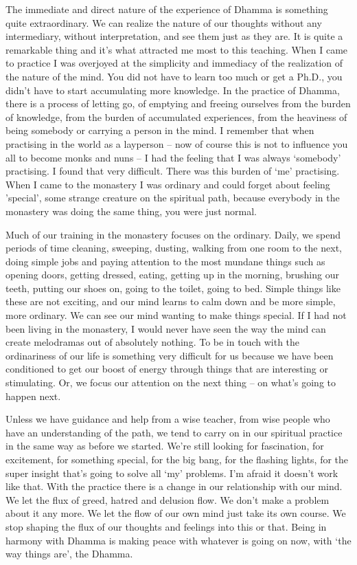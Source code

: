 The immediate and direct nature of the experience of Dhamma is something quite extraordinary. We can realize the nature of our thoughts without any intermediary, without interpretation, and see them just as they are. It is quite a remarkable thing and it's what attracted me most to this teaching. When I came to practice I was overjoyed at the simplicity and immediacy of the realization of the nature of the mind. You did not have to learn too much or get a Ph.D., you didn't have to start accumulating more knowledge. In the practice of Dhamma, there is a process of letting go, of emptying and freeing ourselves from the burden of knowledge, from the burden of accumulated experiences, from the heaviness of being somebody or carrying a person in the mind. I remember that when practising in the world as a layperson -- now of course this is not to influence you all to become monks and nuns -- I had the feeling that I was always `somebody' practising. I found that very difficult. There was this burden of `me' practising. When I came to the monastery I was \mbox{ordinary} and could forget about feeling 'special', some strange creature on the spiritual path, because everybody in the monastery was doing the same thing, you were just normal. 

Much of our training in the monastery focuses on the ordinary. Daily, we spend periods of time cleaning, sweeping, dusting, walking from one room to the next, doing simple jobs and paying attention to the most mundane things such as opening doors, getting dressed, eating, getting up in the morning, brushing our teeth, putting our shoes on, going to the toilet, going to bed. Simple things like these are not exciting, and our mind learns to calm down and be more simple, more ordinary. We can see our mind wanting to make things special. If I had not been living in the monastery, I would never have seen the way the mind can create melodramas out of absolutely nothing. To be in touch with the ordinariness of our life is something very difficult for us because we have been conditioned to get our boost of energy through things that are interesting or stimulating. Or, we focus our attention on the next thing -- on what's going to happen next.

Unless we have guidance and help from a wise teacher, from wise people who have an understanding of the path, we tend to carry on in our spiritual practice in the same way as before we started. We're still looking for fascination, for excitement, for something special, for the big bang, for the flashing lights, for the super insight that's going to solve all `my' problems. I'm afraid it doesn't work like that. With the practice there is a change in our relationship with our mind. We let the flux of greed, hatred and delusion flow. We don't make a problem about it any more. We let the flow of our own mind just take its own course. We stop shaping the flux of our thoughts and feelings into this or that. Being in harmony with Dhamma is making peace with whatever is going on now, with `the way things are', the Dhamma.

